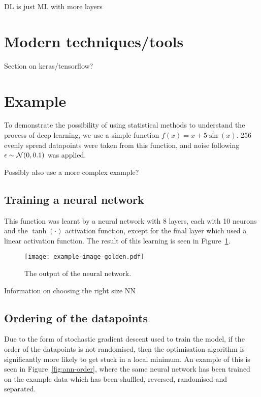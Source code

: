 \begin{todo}
	DL is just ML with more layers 
\end{todo}

\section{Modern techniques/tools}

\begin{todo}
	Section on keras/tensorflow?
\end{todo}

\section{Example}

To demonstrate the possibility of using statistical methods to understand the process of deep learning, we use a simple function \(f(x) = x + 5 \sin(x)\).
256 evenly spread datapoints were taken from this function, and noise following \(\epsilon \sim \mathcal{N}(0, 0.1)\) was applied.

\begin{todo}
Possibly also use a more complex example?
\end{todo}

\subsection{Training a neural network}

This function was learnt by a neural network with 8 layers, each with 10 neurons and the \(\tanh(\cdot)\) activation function, except for the final layer which used a linear activation function.
The result of this learning is seen in Figure~\ref{fig:ann-output}.

\begin{figure}[htbp]
	\centering
	\texttt{[image: example-image-golden.pdf]}
	\caption{The output of the neural network.}
	\label{fig:ann-output}
\end{figure}

\begin{todo}
Information on choosing the right size NN
\end{todo}

\subsection{Ordering of the datapoints}

Due to the form of stochastic gradient descent used to train the model, if the order of the datapoints is not randomised, then the optimisation algorithm is significantly more likely to get stuck in a local minimum.
An example of this is seen in Figure~\ref{fig:ann-order}, where the same neural network has been trained on the example data which has been shuffled, reversed, randomised and separated.

